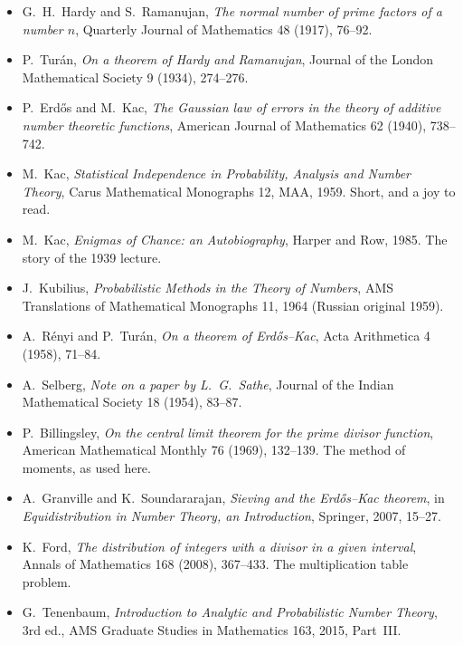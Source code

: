 \begin{itemize}
\item G.~H.~Hardy and S.~Ramanujan, \emph{The normal number of prime factors of a number $n$}, Quarterly Journal of Mathematics 48 (1917), 76--92.
\item P.~Turán, \emph{On a theorem of Hardy and Ramanujan}, Journal of the London Mathematical Society 9 (1934), 274--276.
\item P.~Erd\H{o}s and M.~Kac, \emph{The Gaussian law of errors in the theory of additive number theoretic functions}, American Journal of Mathematics 62 (1940), 738--742.
\item M.~Kac, \emph{Statistical Independence in Probability, Analysis and Number Theory}, Carus Mathematical Monographs 12, MAA, 1959. Short, and a joy to read.
\item M.~Kac, \emph{Enigmas of Chance: an Autobiography}, Harper and Row, 1985. The story of the 1939 lecture.
\item J.~Kubilius, \emph{Probabilistic Methods in the Theory of Numbers}, AMS Translations of Mathematical Monographs 11, 1964 (Russian original 1959).
\item A.~Rényi and P.~Turán, \emph{On a theorem of Erd\H{o}s--Kac}, Acta Arithmetica 4 (1958), 71--84.
\item A.~Selberg, \emph{Note on a paper by L.~G.~Sathe}, Journal of the Indian Mathematical Society 18 (1954), 83--87.
\item P.~Billingsley, \emph{On the central limit theorem for the prime divisor function}, American Mathematical Monthly 76 (1969), 132--139. The method of moments, as used here.
\item A.~Granville and K.~Soundararajan, \emph{Sieving and the Erd\H{o}s--Kac theorem}, in \emph{Equidistribution in Number Theory, an Introduction}, Springer, 2007, 15--27.
\item K.~Ford, \emph{The distribution of integers with a divisor in a given interval}, Annals of Mathematics 168 (2008), 367--433. The multiplication table problem.
\item G.~Tenenbaum, \emph{Introduction to Analytic and Probabilistic Number Theory}, 3rd ed., AMS Graduate Studies in Mathematics 163, 2015, Part~III.
\end{itemize}
